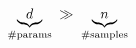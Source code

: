 \documentclass[preview]{standalone}
\begin{document}
\begin{align*}
\special{dvisvgm:raw <g id='unique000'>}\underbrace{d}_{\#\text{params}} \;\gg\; \underbrace{n}_{\#\text{samples}}\special{dvisvgm:raw </g>}
\end{align*}
\end{document}
